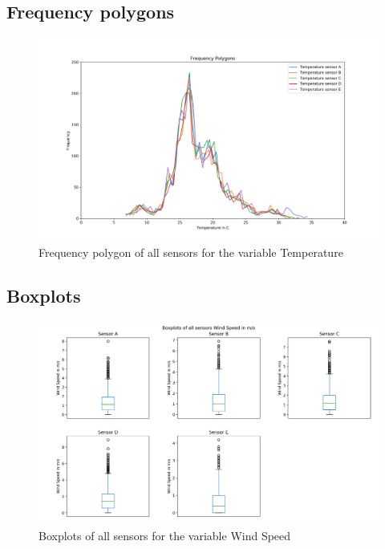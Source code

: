\documentclass{article}
\begin{document}
    \subsection{Frequency polygons}
        \begin{figure}[H]
            \includegraphics[width=\textwidth]{frequency_polygons_temp}
            \caption{Frequency polygon of all sensors for the variable Temperature}
        \end{figure}
            

    \subsection{Boxplots}
        
        \begin{figure}[H]
            \includegraphics[width=\textwidth]{boxplot_windspeed}
            \caption{Boxplots of all sensors for the variable Wind Speed}
        \end{figure}
        
\end{document}

